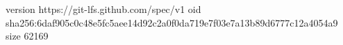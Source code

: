 version https://git-lfs.github.com/spec/v1
oid sha256:6daf905c0c48e5fc5aee14d92c2a0f0da719e7f03e7a13b89d6777c12a4054a9
size 62169
